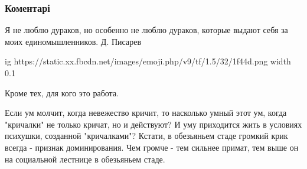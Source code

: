  
 
 
 
 
\subsubsection{Коментарі}

\begin{itemize}
 
Я не люблю дураков, но особенно не люблю дураков, которые выдают себя за моих единомышленников. Д. Писарев

 

\ifcmt
  ig https://static.xx.fbcdn.net/images/emoji.php/v9/tf/1.5/32/1f44d.png
  width 0.1
\fi


 
Кроме тех, для кого это работа.

 

Если ум молчит, когда невежество кричит, то насколько умный этот ум, когда
"кричалки" не только кричат, но и действуют? И уму приходится жить в условиях
психушки, созданной "кричалками"? Кстати, в обезьяньем стаде громкий крик
всегда - признак доминирования. Чем громче - тем сильнее примат, тем выше он на
социальной лестнице в обезьяньем стаде.



\end{itemize}
